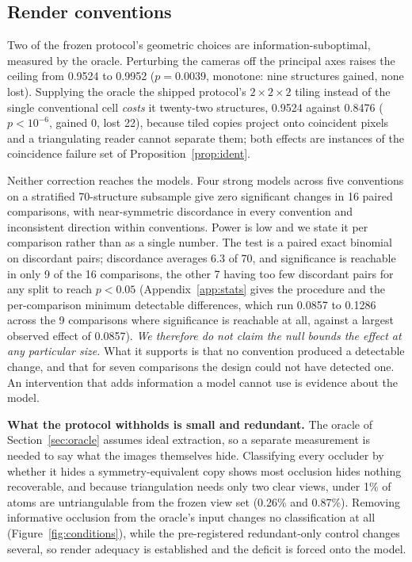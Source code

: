 \subsection{Render conventions}
\label{sec:conventions}

Two of the frozen protocol's geometric choices are information-suboptimal, measured by the oracle.
Perturbing the cameras off the principal axes raises the ceiling from 0.9524 to 0.9952 ($p = 0.0039$,
monotone: nine structures gained, none lost). Supplying the oracle the shipped protocol's $2\times2\times2$ tiling instead of the single conventional cell
\emph{costs} it twenty-two structures, 0.9524 against 0.8476 ($p < 10^{-6}$, gained 0, lost 22), because
tiled copies project onto coincident pixels and a triangulating reader cannot separate them; both effects are instances
of the coincidence failure set of Proposition~\ref{prop:ident}.

Neither correction reaches the models. Four strong models across five conventions on a stratified
70-structure subsample give zero significant changes in 16 paired comparisons, with near-symmetric
discordance in every convention and inconsistent direction within conventions. Power is low and we state it
per comparison rather than as a single number. The test is a paired exact binomial on discordant pairs;
discordance averages 6.3 of 70, and significance is reachable in only 9 of the 16 comparisons, the other 7
having too few discordant pairs for any split to reach $p<0.05$ (Appendix~\ref{app:stats} gives the
procedure and the per-comparison minimum detectable differences, which run 0.0857 to 0.1286 across the 9
comparisons where significance is reachable at all, against a largest observed effect of 0.0857). \emph{We therefore do not claim the null bounds the effect at any
particular size.} What it supports is that no convention produced a detectable change, and that for seven
comparisons the design could not have detected one. An intervention that adds information a model cannot
use is evidence about the model.

\textbf{What the protocol withholds is small and redundant.} The oracle of Section~\ref{sec:oracle} assumes
ideal extraction, so a separate measurement is needed to say what the images themselves hide. Classifying
every occluder by whether it hides a symmetry-equivalent copy shows most occlusion hides nothing
recoverable, and because triangulation needs only two clear views, under 1\% of atoms are untriangulable
from the frozen view set (0.26\% and 0.87\%).
Removing informative occlusion from the oracle's input changes no classification at all
(Figure~\ref{fig:conditions}), while the pre-registered redundant-only control changes several, so render
adequacy is established and the deficit is forced onto the model.
